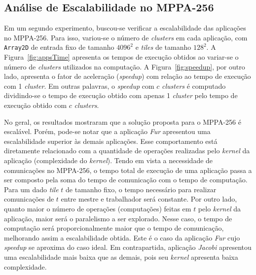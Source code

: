 \documentclass[12pt]{article}
\newcommand{\mppa}{MPPA-256\xspace}
\begin{document}
\subsection{Análise de Escalabilidade no \mppa}

Em um segundo experimento, buscou-se verificar a escalabilidade das aplicações
no \mppa. Para isso, variou-se o número de \textit{clusters} em cada aplicação,
com \texttt{Array2D} de entrada fixo de tamanho $4096^2$ e \textit{tiles} de
tamanho $128^2$. A Figura~\ref{fig:appsTime} apresenta os tempos de execução
obtidos ao variar-se o número de \textit{clusters} utilizados na computação. A
Figura~\ref{fig:speedup}, por outro lado, apresenta o fator de aceleração
(\textit{speedup}) com relação ao tempo de execução com 1 \textit{cluster}. Em
outras palavras, o \textit{speedup} com $c$ \textit{clusters} é computado
dividindo-se o tempo de execução obtido com apenas 1 \textit{cluster} pelo tempo
de execução obtido com $c$ \textit{clusters}.

No geral, os resultados mostraram que a solução proposta para o \mppa é
escalável. Porém, pode-se notar que a aplicação \textit{Fur} apresentou uma
escalabilidade superior às demais aplicações. Esse comportamento está
diretamente relacionado com a quantidade de operações realizadas pelo
\textit{kernel} da aplicação (complexidade do \textit{kernel}). Tendo em vista a
necessidade de comunicações no \mppa, o tempo total de execução de uma aplicação
passa a ser composto pela soma do tempo de comunicação com o tempo de
computação. Para um dado \textit{tile} $t$ de tamanho fixo, o tempo necessário
para realizar comunicações de $t$ entre mestre e trabalhador será constante. Por
outro lado, quanto maior o número de operações (computações) feitas em $t$ pelo
\textit{kernel} da aplicação, maior será o paralelismo a ser explorado. Nesse
caso, o tempo de computação será proporcionalmente maior que o tempo de
comunicação, melhorando assim a escalabilidade obtida. Este é o caso da
aplicação \textit{Fur} cujo \textit{speedup} se aproxima do caso ideal. Em
contrapartida, aplicação \textit{Jacobi} apresentou uma escalabilidade mais
baixa que as demais, pois seu \textit{kernel} apresenta baixa complexidade.
\end{document}
